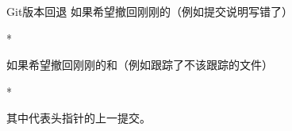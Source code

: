 \begin{frame}{Git版本回退}
    如果希望撤回刚刚的（例如提交说明写错了）
    \begin{Code}*
        
    \end{Code}
    如果希望撤回刚刚的和（例如跟踪了不该跟踪的文件）
    \begin{Code}*
        
    \end{Code}
    其中代表头指针的上一提交。
\end{frame}
